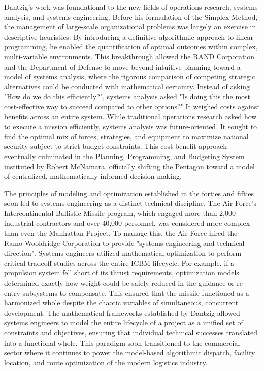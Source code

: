 Dantzig’s work was foundational to the new fields of operations research, systems analysis, and systems engineering. Before his formulation of the Simplex Method, the management of large-scale organizational problems was largely an exercise in descriptive heuristics. By introducing a definitive algorithmic approach to linear programming, he enabled the quantification of optimal outcomes within complex, multi-variable environments. This breakthrough allowed the RAND Corporation and the Department of Defense to move beyond intuitive planning toward a model of systems analysis, where the rigorous comparison of competing strategic alternatives could be conducted with mathematical certainty. Instead of asking "How do we do this efficiently?", systems analysis asked "Is doing this the most cost-effective way to succeed compared to other options?" It weighed costs against benefits across an entire system. While traditional operations research asked how to execute a mission efficiently, systems analysis was future-oriented. It sought to find the optimal mix of forces, strategies, and equipment to maximize national security subject to strict budget constraints. This cost-benefit approach eventually culminated in the Planning, Programming, and Budgeting System instituted by Robert McNamara, officially shifting the Pentagon toward a model of centralized, mathematically-informed decision making. \cite{enthovenHowSystemsAnalysis2019} \cite{enthovenHowMuchEnough1971} \cite{fisherOperationsResearchRAND1994}

The principles of modeling and optimization established in the forties and fifties soon led to systems engineering as a distinct technical discipline. The Air Force's Intercontinental Ballistic Missile program, which engaged more than 2,000 industrial contractors and over 40,000 personnel, was considered more complex than even the Manhattan Project. To manage this, the Air Force hired the Ramo-Wooldridge Corporation to provide "systems engineering and technical direction". Systems engineers utilized mathematical optimization to perform critical tradeoff studies across the entire ICBM lifecycle. For example, if a propulsion system fell short of its thrust requirements, optimization models determined exactly how weight could be safely reduced in the guidance or re-entry subsystems to compensate. This ensured that the missile functioned as a harmonized whole despite the chaotic variables of simultaneous, concurrent development. The mathematical frameworks established by Dantzig allowed systems engineers to model the entire lifecycle of a project as a unified set of constraints and objectives, ensuring that individual technical successes translated into a functional whole. This paradigm soon transitioned to the commercial sector where it continues to power the model-based algorithmic dispatch, facility location, and route optimization of the modern logistics industry. \cite{dyerNecessityMotherConvention1993} \cite{neufeldBallisticMissilesUnited1990}

